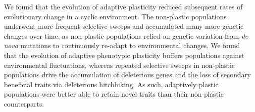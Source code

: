 We found that the evolution of adaptive plasticity reduced subsequent rates of evolutionary change in a cyclic environment.
The non-plastic populations underwent more frequent selective sweeps and accumulated many more genetic changes over time, as non-plastic populations relied on genetic variation from \textit{de novo} mutations to continuously re-adapt to environmental changes. 
We found that the evolution of adaptive phenotypic plasticity buffers populations against environmental fluctuations, whereas repeated selective sweeps in non-plastic populations drive the accumulation of deleterious genes and the loss of secondary beneficial traits via deleterious hitchhiking.
As such, adaptively plastic populations were better able to retain novel traits than their non-plastic counterparts.



